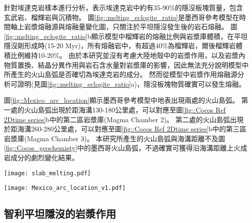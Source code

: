 \citealp{stern1996role}針對埃達克岩樣本進行分析，表示埃達克岩中約有35-90$\%$的隱沒板塊質量，包含玄武岩、榴輝岩與沉積物。
圖\ref{fig::melting_eclogite_ratio}是墨西哥參考模型在時間軸上岩漿熔融源與熔融量變化圖，只關注於平坦隱沒發生後的岩石熔融。
圖\ref{fig::melting_eclogite_ratio}b顯示模型中榴輝岩的熔融比例與岩漿庫體積，在平坦隱沒剛形成時(15-20 Myr)，所有熔融岩中，有超過40$\%$為榴輝岩，爾後榴輝岩體積比例維持10-20$\%$。
由於本研究並沒有考慮大陸地殼中的岩漿作用，以及岩漿內物質置換、結晶分異作用與岩石含水量對岩漿庫的影響，因此無法充分說明模型中所產生的火山島弧是否確切為埃達克岩的成分。
然而從模型中岩漿作用熔融源分析可證明(見圖\ref{fig::melting_eclogite_ratio}a)，隱沒板塊物質確實可以發生熔融。

圖\ref{fig::Mexico_arc_location}顯示墨西哥參考模型中地表出現兩處的火山島弧。
第一處的火山島弧出現於距海溝130-180公里處，可以對應至圖\ref{fig::Cocos Ref 2Dtime series}b中的第二區岩漿庫(Magma Chamber 2)。
第二處的火山島弧出現於距海溝260-280公里處，可以對應至圖\ref{fig::Cocos Ref 2Dtime series}b中的第三區岩漿庫(Magma Chamber 3)。
本研究所產生的火山島弧與海溝距離不及圖\ref{fig::Cocos_geochemisty}中的墨西哥火山島弧，不過確實可獲得沿海溝距離上火成岩成分的劇烈變化結果。

\begin{figure*}[ht!]
    \centering
    \texttt{[image: slab\_melting.pdf]}
    \caption[墨西哥參考模型部分熔融源岩與岩漿庫分析]{墨西哥參考模型部分熔融源岩與岩漿庫分析。(a)同圖\ref{fig::Cocos Ref melting time}b，聚焦在13-40 Myr時期的部分熔融源岩，熔融量單位為每單位海溝產生之立方公里量中每20萬年瞬時量，模型中包含橄欖岩(綠色)、沉積岩(橘色)與榴輝岩(深藍色)熔融。灰底為平坦隱沒發生時間。(b)黃底柱狀為岩漿庫體積，藍點為榴輝岩瞬時熔融體積佔整體瞬時熔融體積的比例。
    }
    \label{fig::melting_eclogite_ratio}
\end{figure*}

\begin{figure*}[ht!]
    \centering
    \texttt{[image: Mexico\_arc\_location\_v1.pdf]}
    \caption[墨西哥參考模型火山島弧與海溝距離隨時間變化]{墨西哥參考模型火山島弧與海溝距離隨時間變化。其中咖啡色為熔融源岩以橄欖岩為主的火山島弧，藍色則為熔融源岩以沉積物與榴輝岩為主的火山島弧。
    }
    \label{fig::Mexico_arc_location}
\end{figure*}

\newpage
\subsection{智利平坦隱沒的岩漿作用}

